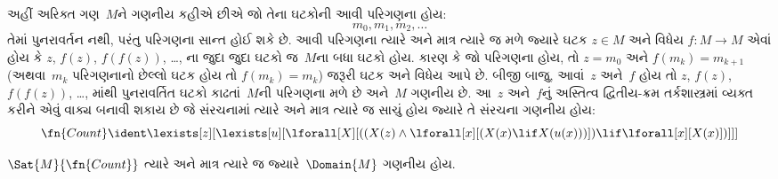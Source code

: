 અહીં અરિક્ત ગણ~$M$ને ગણનીય કહીએ છીએ જો તેના ઘટકોની
આવી પરિગણના હોય:
\[
m_0, m_1, m_2, \dots
\]
તેમાં પુનરાવર્તન નથી, પરંતુ પરિગણના સાન્ત હોઈ શકે છે.
આવી પરિગણના ત્યારે અને માત્ર ત્યારે જ મળે જ્યારે ઘટક
$z \in M$ અને વિધેય $f\colon M \to M$ એવાં હોય કે $z$, $f(z)$,
$f(f(z))$, \dots, ના જુદા જુદા ઘટકો જ~$M$ના બધા ઘટકો હોય.
કારણ કે જો પરિગણના હોય, તો $z = m_0$ અને $f(m_k) = m_{k+1}$
(અથવા~$m_k$ પરિગણનાનો છેલ્લો ઘટક હોય તો
$f(m_k) = m_k$) જરૂરી ઘટક અને વિધેય આપે છે. બીજી બાજુ,
આવાં~$z$ અને~$f$ હોય તો $z$, $f(z)$, $f(f(z))$, \dots, માંથી
પુનરાવર્તિત ઘટકો કાઢતાં~$M$ની પરિગણના મળે છે અને~$M$
ગણનીય છે. આ~$z$ અને~$f$નું અસ્તિત્વ દ્વિતીય-ક્રમ
તર્કશાસ્ત્રમાં વ્યક્ત કરીને એવું વાક્ય બનાવી શકાય છે જે
સંરચનામાં ત્યારે અને માત્ર ત્યારે જ સાચું હોય જ્યારે તે
સંરચના ગણનીય હોય:
\[
\fn{Count} \ident
\lexists[z][\lexists[u][\lforall[X][((X(z) \land
      \lforall[x][(X(x) \lif X(u(x)))]) \lif \lforall[x][X(x)])]]]
\]

\begin{prop}
$\Sat{M}{\fn{Count}}$ ત્યારે અને માત્ર ત્યારે જ જ્યારે~$\Domain{M}$
ગણનીય હોય.
\end{prop}

